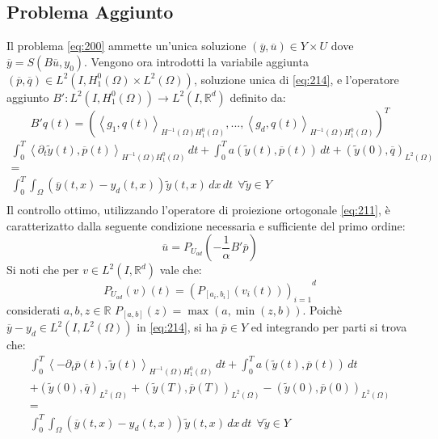 \subsection{Problema Aggiunto}
Il problema \ref{eq:200} ammette un'unica soluzione $(\overline{y},\overline{u}){\in}Y{\times}U$ dove $\overline{y}=S(B\overline{u},y_0)$.
Vengono ora introdotti la variabile aggiunta $(\overline{p},\overline{q}) \in L^2(I,{H^{0}_{1}(\Omega)}{\times}{L^{2}(\Omega)})$, soluzione unica di \ref{eq:214}, e l'operatore aggiunto $B':L^2(I,{H^{0}_{1}(\Omega)}){\rightarrow}L^2(I,\mathbb{R}^d)$ definito da:
\begin{equation}
B'q(t) = ( \left \langle g_1,q(t) \right \rangle_{{H^{-1}(\Omega)}{H^{0}_{1}(\Omega)}}, . . . ,\left \langle g_d,q(t) \right \rangle_{{H^{-1}(\Omega)}{H^{0}_{1}(\Omega)}})^T
\label{eq:212}
\end{equation}
\begin{equation}
\begin{array}{c}
	\int_{0}^{T} \left \langle {\partial_{t}}\tilde{y}(t),\overline{p}(t) \right \rangle_{{H^{-1}(\Omega)}{H^{0}_{1}(\Omega)}} \, dt +  	\int_{0}^{T} a(\tilde{y}(t),\overline{p}(t)) \, dt + (\tilde{y}(0),\overline{q})_{L^{2}(\Omega)}  \\
	 = \\
	\int_{0}^{T} \int_{\Omega} (\overline{y}(t,x)-y_d(t,x))\tilde{y}(t,x) \,dx \, dt  \ \ \forall \tilde{y} \in Y \\
\end{array}
\label{eq:214}
\end{equation}
Il controllo ottimo, utilizzando l'operatore di proiezione ortogonale \ref{eq:211}, è caratterizatto dalla seguente condizione necessaria e sufficiente del primo ordine:
\begin{equation}
\overline{u}=P_{U_{ad}}\left( -\frac{1}{\alpha}B'\overline{p} \right)
\label{eq:213}
\end{equation}
Si noti che per $v \in L^2(I,\mathbb{R}^d)$ vale che:
\begin{equation}
P_{U_{ad}}(v)(t) = {(P_{[a_i,b_i]}(v_i(t)))_{i=1}}^d
\label{eq:215}
\end{equation}
considerati $a,b,z \in \mathbb{R}$ $P_{[a,b]}(z) = \max(a,\min(z,b))$.
Poichè $\overline{y} - y_d \in L^2(I,{L^{2}(\Omega)})$ in \ref{eq:214}, si ha $\overline{p} \in Y$ ed integrando per parti si trova che:
{\renewcommand\arraystretch{2}
\begin{equation}
\begin{array}{c}
	\int_{0}^{T} \left \langle -{\partial_{t}}\overline{p}(t),\tilde{y}(t) \right \rangle_{{H^{-1}(\Omega)}{H^{0}_{1}(\Omega)}} \, dt +  	\int_{0}^{T} a(\tilde{y}(t),\overline{p}(t)) \, dt \\
	+ (\tilde{y}(0),\overline{q})_{L^{2}(\Omega)} + (\tilde{y}(T),\overline{p}(T))_{L^{2}(\Omega)} - (\tilde{y}(0),\overline{p}(0))_{L^{2}(\Omega)} \\
	 = \\
	\int_{0}^{T} \int_{\Omega} (\overline{y}(t,x)-y_d(t,x))\tilde{y}(t,x) \,dx \, dt  \ \ \forall \tilde{y} \in Y \\
\end{array}
\label{eq:216}
\end{equation}
} %
